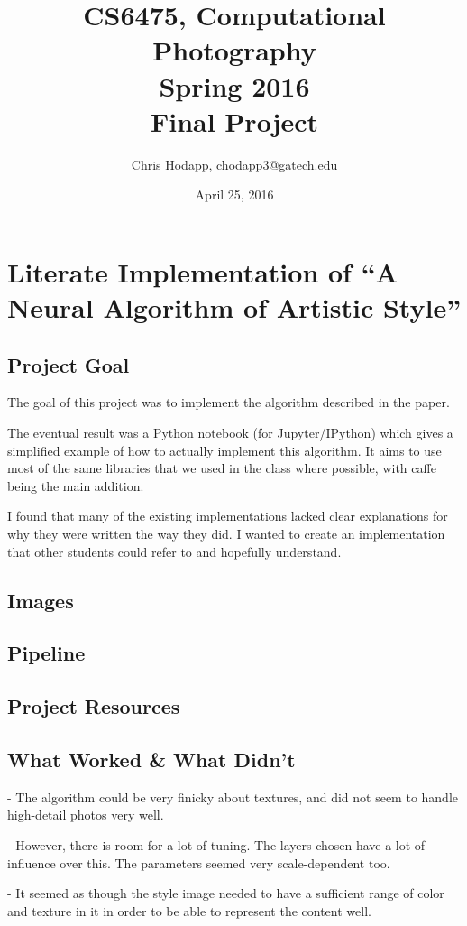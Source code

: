 \documentclass{article}
\title
    {CS6475, Computational Photography \\
      Spring 2016 \\
      Final Project}
\date{April 25, 2016}
\author{Chris Hodapp, chodapp3@gatech.edu}
\begin{document}
\section{Literate Implementation of ``A Neural Algorithm of Artistic Style''}

\subsection{Project Goal}

The goal of this project was to implement the algorithm described in
the paper.

The eventual result was a Python notebook (for Jupyter/IPython) which
gives a simplified example of how to actually implement this
algorithm.  It aims to use most of the same libraries that we used in
the class where possible, with caffe being the main addition.

I found that many of the existing implementations lacked clear
explanations for why they were written the way they did.  I wanted to
create an implementation that other students could refer to and
hopefully understand.

\subsection{Images}

\subsection{Pipeline}

\subsection{Project Resources}


\subsection{What Worked \& What Didn't}

- The algorithm could be very finicky about textures, and did not seem
to handle high-detail photos very well.

- However, there is room for a lot of tuning.  The layers chosen have
a lot of influence over this.  The parameters seemed very
scale-dependent too.

- It seemed as though the style image needed to have a sufficient
range of color and texture in it in order to be able to represent the
content well.
\end{document}
